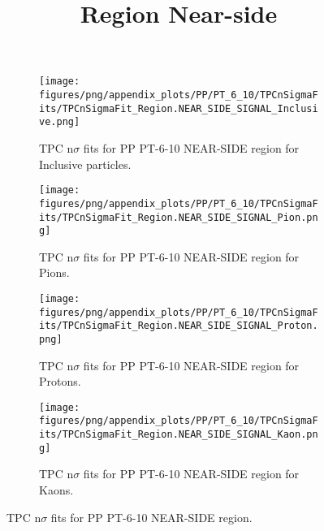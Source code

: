             \begin{figure}[H]
                \title{Region Near-side}
                \begin{subfigure}[b]{0.5\textwidth}
                    \centering
                    \texttt{[image: figures/png/appendix\_plots/PP/PT\_6\_10/TPCnSigmaFits/TPCnSigmaFit\_Region.NEAR\_SIDE\_SIGNAL\_Inclusive.png]}
                    \caption{TPC n$\sigma$ fits for PP PT-6-10 NEAR-SIDE region for Inclusive particles.}
                    \label{fig:appendix_PP_PT-6-10_NEAR_SIDE_SIGNAL_Inclusive}
                \end{subfigure}
                \begin{subfigure}[b]{0.5\textwidth}
                    \centering
                    \texttt{[image: figures/png/appendix\_plots/PP/PT\_6\_10/TPCnSigmaFits/TPCnSigmaFit\_Region.NEAR\_SIDE\_SIGNAL\_Pion.png]}
                    \caption{TPC n$\sigma$ fits for PP PT-6-10 NEAR-SIDE region for Pions.}
                    \label{fig:appendix_PP_PT-6-10_NEAR_SIDE_SIGNAL_Pion}
                \end{subfigure}
                \begin{subfigure}[b]{0.5\textwidth}
                    \centering
                    \texttt{[image: figures/png/appendix\_plots/PP/PT\_6\_10/TPCnSigmaFits/TPCnSigmaFit\_Region.NEAR\_SIDE\_SIGNAL\_Proton.png]}
                    \caption{TPC n$\sigma$ fits for PP PT-6-10 NEAR-SIDE region for Protons.}
                    \label{fig:appendix_PP_PT-6-10_NEAR_SIDE_SIGNAL_Proton}
                \end{subfigure}
                \begin{subfigure}[b]{0.5\textwidth}
                    \centering
                    \texttt{[image: figures/png/appendix\_plots/PP/PT\_6\_10/TPCnSigmaFits/TPCnSigmaFit\_Region.NEAR\_SIDE\_SIGNAL\_Kaon.png]}
                    \caption{TPC n$\sigma$ fits for PP PT-6-10 NEAR-SIDE region for Kaons.}
                    \label{fig:appendix_PP_PT-6-10_NEAR_SIDE_SIGNAL_Kaon}
                \end{subfigure}
                \caption{TPC n$\sigma$ fits for PP PT-6-10 NEAR-SIDE region.}
                \label{fig:appendix_PP_PT-6-10_NEAR_SIDE_SIGNAL}
            \end{figure}

